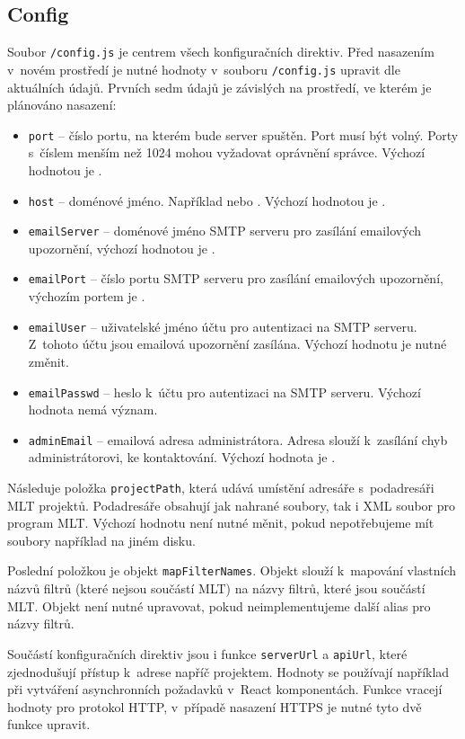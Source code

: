 \subsection{Config\label{cap:config}}
Soubor \texttt{/config.js} je centrem všech konfiguračních direktiv. Před nasazením v~novém prostředí je nutné hodnoty v~souboru \texttt{/config.js} upravit dle aktuálních údajů. Prvních sedm údajů je závislých na prostředí, ve kterém je plánováno nasazení:
\begin{itemize}
\item \texttt{port} -- číslo portu, na kterém bude server spuštěn. Port musí být volný. Porty s~číslem menším než 1024 mohou vyžadovat oprávnění správce. Výchozí hodnotou je .
\item \texttt{host} -- doménové jméno. Například  nebo . Výchozí hodnotou je .
\item \texttt{emailServer} -- doménové jméno SMTP serveru pro zasílání emailových upozornění, výchozí hodnotou je .
\item \texttt{emailPort} -- číslo portu SMTP serveru pro zasílání emailových upozornění, výchozím portem je .
\item \texttt{emailUser} -- uživatelské jméno účtu pro autentizaci na SMTP serveru. Z~tohoto účtu jsou emailová upozornění zasílána. Výchozí hodnotu  je nutné změnit.
\item \texttt{emailPasswd} -- heslo k~účtu pro autentizaci na SMTP serveru. Výchozí hodnota nemá význam.
\item \texttt{adminEmail} -- emailová adresa administrátora. Adresa slouží k~zasílání chyb administrátorovi, ke kontaktování. Výchozí hodnota je .
\end{itemize}

Následuje položka \texttt{projectPath}, která udává umístění adresáře s~podadresáři MLT projektů. Podadresáře obsahují jak nahrané soubory, tak i XML soubor pro program MLT. Výchozí hodnotu  není nutné měnit, pokud nepotřebujeme mít soubory například na jiném disku.

Poslední položkou je objekt \texttt{mapFilterNames}. Objekt slouží k~mapování vlastních názvů filtrů (které nejsou součástí MLT) na názvy filtrů, které jsou součástí MLT. Objekt není nutné upravovat, pokud neimplementujeme další alias pro názvy filtrů.

Součástí konfiguračních direktiv jsou i funkce \texttt{serverUrl} a \texttt{apiUrl}, které zjednodušují přístup k~adrese napříč projektem. Hodnoty se používají například při vytváření asynchronních požadavků v~React komponentách. Funkce vracejí hodnoty pro protokol HTTP, v~případě nasazení HTTPS je nutné tyto dvě funkce upravit.

